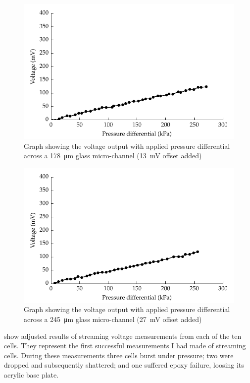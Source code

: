       \begin{figure}
          \centering
          \includegraphics{content/pt1/01-PowerHarvesting/graphics/streamingCell_voltVsPress_178um_out}
          \caption{\label{fig:VvsP_178um}Graph showing the voltage output with applied pressure differential across a \SI{178}{\micro\metre} glass micro-channel (\SI{13}{\milli\volt} offset added)}
      \end{figure}

      \begin{figure}
          \centering
          \includegraphics{content/pt1/01-PowerHarvesting/graphics/streamingCell_voltVsPress_245um_out}
          \caption{\label{fig:VvsP_245um}Graph showing the voltage output with applied pressure differential across a \SI{245}{\micro\metre} glass micro-channel (\SI{27}{\milli\volt} offset added)}
      \end{figure}

       show adjusted results of streaming voltage measurements from each of the ten cells.
      They represent the first successful measurements I had made of streaming cells.
      During these measurements three cells burst under pressure; two were dropped and subsequently shattered; and one suffered epoxy failure, loosing its acrylic base plate.


